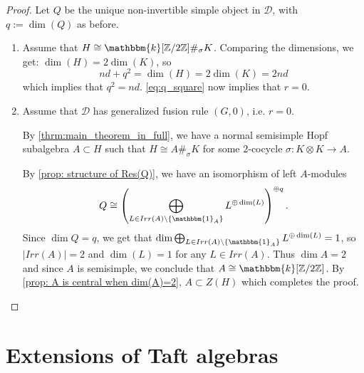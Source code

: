 \documentclass{amsart}
\theoremstyle{plain}%
\theoremstyle{remark}
\newcommand{\1}{\mathbbm{1}}
\newcommand{\D}{\mathcal{D}}
\newcommand{\Z}{\mathbb{Z}}
\newcommand{\Rep}{\mathrm{Rep}}
\newcommand{\kk}{\mathbbm{k}}
\newcommand{\pic}{\mathrm{Pic}}
\newcommand{\res}{\mathrm{Res}}
\begin{document}
    \begin{proof}
        Let $Q$ be the unique non-invertible simple object in $\D$, with $q:=\dim(Q)$ as before. 
    
        \begin{enumerate}
            \item[\textbf{[(2) $\Longrightarrow$ (1)]}] Assume that $H\cong \kk[\Z/2\Z]\#_\sigma K$. Comparing the dimensions, we get: $\dim(H) = 2\dim(K)$, so $$nd+q^2 = \dim(H) = 2\dim(K) = 2nd$$ which implies that $q^2=nd$. \cref{eq:q_square} now implies that $r=0$.
            \item[\textbf{[(1) $\Longrightarrow$ (2)]}] Assume that $\D$ has generalized fusion rule $(G,0)$, i.e. $r=0$.
            
  By \cref{thrm:main_theorem_in_full}, we have a normal semisimple Hopf subalgebra $A\subset H$ such that $H\cong A\#_\sigma K$ for some $2$-cocycle $\sigma:K\otimes K\to A$. 
  
            By \cref{prop: structure of Res(Q)}, we have an isomorphism of left $A$-modules
        $$Q \cong  \left(\bigoplus_{L\in Irr(A)\setminus\{\1_A\}}L^{\oplus \dim(L)}\right)^{\oplus q}.$$
            Since $\dim Q=q$, we get that $\dim \bigoplus_{L\in Irr(A)\setminus\{\1_A\}}L^{\oplus \dim(L)} =1$, so $|Irr(A)|=2$ and $\dim(L)=1$ for any $L\in Irr(A)$. Thus $\dim A=2$ and since $A$ is semisimple, we conclude that $A\cong \kk[\Z/2\Z]$. By \cref{prop: A is central when dim(A)=2}, $A\subset Z(H)$ which completes the proof.
          
        \end{enumerate}

        
    
        
    \end{proof}

\section{Extensions of Taft algebras}\label{sec: Extending H_{n,d}}
\end{document}
